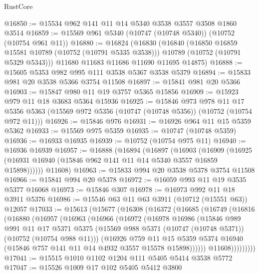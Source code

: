\begin{lexlean}{RustCore}
\begin{coremodule}
@16850 := @15534 @962 @141 @11 @14 @5340 @3538 @3557 @3508 @1860 @3514
@16859 := @15569 @961 @5340 (@10747 (@10748 @5340)) (@10752 (@10754 @961 @11))
@16880 := @16824
    (@16830
      (@16840
        (@16850 @16859 @15581 @10789 (@10752 (@10791 @5335 @3538)))
        @10789
        (@10752 (@10791 @5329 @5343)))
      @11680
      @11683
      @11686
      @11690
      @11695
      @14875)
@16888 := @15605 @5353 @982 @995 @111 @3538 @5367 @3538 @5379
@16894 := @15833 @981 @20 @3538 @5366 @3754 @11508
@16897 := @15841 @981 @20 @5366
@16903 := @15847 @980 @11 @19 @3757 @5365 @15856
@16909 := @15923 @979 @11 @18 @3683 @5364 @15936
@16925 := @15846
    @973
    @978
    @11
    @17
    @5356
    @5363
    (@15569 @972 @5356 (@10747 (@10748 @5356)) (@10752 (@10754 @972 @11)))
@16926 := @15846 @976
@16931 := @16926 @964 @11 @15 @5359 @5362
@16933 := @15569 @975 @5359
@16935 := @10747 (@10748 @5359)
@16936 := @16933 @16935
@16939 := @10752 (@10754 @975 @11)
@16940 := @16936 @16939
@16957 := @16888
    (@16894
      (@16897
        (@16903
          (@16909 (@16925 (@16931 @16940 (@15846 @962 @141 @11 @14 @5340 @3557 @16859 @15898))))))
      @11608)
@16963 := @15833 @994 @20 @3538 @5378 @3754 @11508
@16966 := @15841 @994 @20 @5378
@16972 := @16059 @993 @11 @19 @3535 @5377 @16068
@16973 := @15846 @307
@16978 := @16973 @992 @11 @18 @3911 @5376
@16986 := @15546 @63 @11 @63 @3911 (@10712 (@15551 @63)) @12057
@17033 := @15613
    (@15677
      (@16308
        (@16372
          (@16685
            (@16749
              (@16816
                (@16880
                  (@16957
                    (@16963
                      (@16966
                        (@16972
                          (@16978
                            @16986
                            (@15846
                              @989
                              @991
                              @11
                              @17
                              @5371
                              @5375
                              (@15569 @988 @5371 (@10747 (@10748 @5371)) (@10752 (@10754 @988 @11)))
                              (@16926
                                @759
                                @11
                                @15
                                @5359
                                @5374
                                @16940
                                (@15846 @757 @141 @11 @14 @4932 @3557 @15578 @15898))))))
                      @11608)))))))))
@17041 := @15515 @1010 @1102 @1204 @111 @5405 @5414 @3538 @5772
@17047 := @15526 @1009 @17 @102 @5405 @5412 @3800

\end{coremodule}
\end{lexlean}
